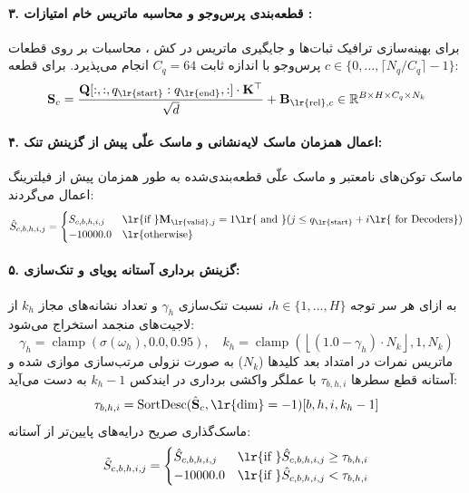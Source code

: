 \paragraph{۳. قطعه‌بندی پرس‌وجو و محاسبه ماتریس خام امتیازات :}
برای بهینه‌سازی ترافیک ثبات‌ها و جایگیری ماتریس در کش ، محاسبات بر روی قطعات پرس‌وجو با اندازه ثابت $C_q = 64$ انجام می‌پذیرد. برای قطعه $c \in \{0, \dots, \lceil N_q / C_q \rceil - 1\}$:
\begin{equation}
\mathbf{S}_c = \frac{\mathbf{Q}[:, :, q_{\text{\lr{start}}}:q_{\text{\lr{end}}}, :] \cdot \mathbf{K}^\top}{\sqrt{d}} + \mathbf{B}_{\text{\lr{rel}}, c} \in \mathbb{R}^{B \times H \times C_q \times N_k}
\end{equation}

\paragraph{۴. اعمال همزمان ماسک لایه‌نشانی و ماسک علّی پیش از گزینش تنک:}
ماسک توکن‌های نامعتبر  و ماسک علّی قطعه‌بندی‌شده  به طور همزمان پیش از فیلترینگ اعمال می‌گردند:
\begin{equation}
\hat{S}_{c, b, h, i, j} = \begin{cases} S_{c, b, h, i, j} & \text{\lr{if }} \mathbf{M}_{\text{\lr{valid}}, j} = 1 \text{\lr{ and }} (j \le q_{\text{\lr{start}}} + i \text{\lr{ for Decoders}}) \\ -10000.0 & \text{\lr{otherwise}} \end{cases}
\end{equation}

\paragraph{۵. گزینش برداری آستانه پویای  و تنک‌سازی:}
به ازای هر سر توجه $h \in \{1, \dots, H\}$، نسبت تنک‌سازی $\gamma_h$ و تعداد نشانه‌های مجاز $k_h$ از لاجیت‌های منجمد استخراج می‌شود:
\begin{equation}
\gamma_h = \operatorname{clamp}\left(\sigma(\omega_h), 0.0, 0.95\right), \quad k_h = \operatorname{clamp}\left(\left\lfloor (1.0 - \gamma_h) \cdot N_k \right\rfloor, 1, N_k\right)
\end{equation}
ماتریس نمرات در امتداد بعد کلیدها ($N_k$) به صورت نزولی مرتب‌سازی موازی شده و آستانه قطع سطرها $\tau_{b, h, i}$ با عملگر واکشی برداری  در ایندکس $k_h - 1$ به دست می‌آید:
\begin{equation}
\tau_{b, h, i} = \operatorname{SortDesc}(\hat{\mathbf{S}}_c, \text{\lr{dim}}=-1)[b, h, i, k_h - 1]
\end{equation}
ماسک‌گذاری صریح درایه‌های پایین‌تر از آستانه:
\begin{equation}
\tilde{S}_{c, b, h, i, j} = \begin{cases} \hat{S}_{c, b, h, i, j} & \text{\lr{if }} \hat{S}_{c, b, h, i, j} \ge \tau_{b, h, i} \\ -10000.0 & \text{\lr{if }} \hat{S}_{c, b, h, i, j} < \tau_{b, h, i} \end{cases}
\end{equation}

